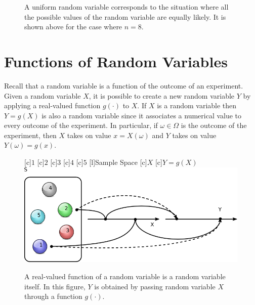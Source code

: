 \begin{figure}[ht]
\begin{center}
\end{center}
\caption{A uniform random variable corresponds to the situation where all the possible values of the random variable are equally likely.
It is shown above for the case where $n = 8$.}
\end{figure}


\section{Functions of Random Variables}
\label{subsection:FunctionDiscreteRV}

Recall that a random variable is a function of the outcome of an experiment.
Given a random variable $X$, it is possible to create a new random variable $Y$ by applying a real-valued function $g(\cdot)$ to $X$.
If $X$ is a random variable then $Y = g(X)$ is also a random variable since it associates a numerical value to every outcome of the experiment.
In particular, if $\omega \in \Omega$ is the outcome of the experiment, then $X$ takes on value $x = X(\omega)$ and $Y$ takes on value $Y(\omega) = g(x)$.

\begin{figure}[htb!]
\begin{center}
\begin{psfrags}
[c]{$1$}
[c]{$2$}
[c]{$3$}
[c]{$4$}
[c]{$5$}
[l]{Sample Space}
[c]{$X$}
[c]{$Y = g(X)$}
\includegraphics[height=4.97cm]{Figures/5Chapter/fcn}
\end{psfrags}
\caption{A real-valued function of a random variable is a random variable itself.
In this figure, $Y$ is obtained by passing random variable $X$ through a function $g (\cdot)$.}
\end{center}
\end{figure}

